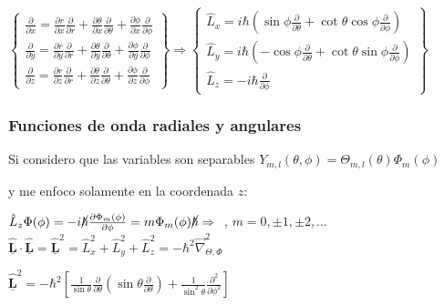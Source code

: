 \documentclass[oneside]{book}
\numberwithin{equation}{section}
\numberwithin{figure}{section}
\numberwithin{table}{section}
\newcommand{\vect}[1]{\underline{\textbf{#1}}}
\begin{document}
					\begin{center}
						$\begin{Bmatrix}{\frac{\partial}{\partial x}=\frac{\partial r}{\partial x}\frac{\partial}{\partial r}+\frac{\partial \theta}{\partial x}\frac{\partial}{\partial \theta}+\frac{\partial \phi}{\partial x}\frac{\partial}{\partial \phi}} \\ \frac{\partial}{\partial y}=\frac{\partial r}{\partial y}\frac{\partial}{\partial r}+\frac{\partial \theta}{\partial y}\frac{\partial}{\partial \theta}+\frac{\partial \phi}{\partial y}\frac{\partial}{\partial \phi} \\ \frac{\partial}{\partial z}=\frac{\partial r}{\partial z}\frac{\partial}{\partial r}+\frac{\partial \theta}{\partial z}\frac{\partial}{\partial \theta}+\frac{\partial \phi}{\partial z}\frac{\partial}{\partial \phi} \end{Bmatrix}  \Rightarrow \begin{Bmatrix}{\hat{L}_x=i\hbar \left(\sin \phi \frac{\partial}{\partial \theta}+\cot \theta \cos \phi \frac{\partial}{\partial \phi}\right)} \\ \hat{L}_y=i\hbar \left(-\cos \phi \frac{\partial}{\partial \theta}+\cot \theta \sin \phi \frac{\partial}{\partial \phi}\right) \\ \hat{L}_z=-i\hbar \frac{\partial}{\partial \phi} \end{Bmatrix}$
					\end{center}					
					
				\subsubsection{Funciones de onda radiales y angulares}		
					
					Si considero que las variables son separables $Y_{m,l}(\theta,\phi)=\Theta_{m,l}(\theta)\Phi_m(\phi)$					
					
					 y me enfoco solamente en la coordenada $z$:\\
					
					\begin{center}
						$\hat{L}_z \Phi(\phi)=-i \cancel{\hbar} \frac{\partial \Phi_m(\phi)}{\partial \phi}=m \Phi_m(\phi)\cancel{\hbar} \Rightarrow$  $\text{ , } m=0,\pm 1,\pm 2,\ldots$\\
						
						$\hat{\vect{L}} \cdot \hat{\vect{L}}=\hat{\vect{L}}^2=\hat{L}_x^2+\hat{L}_y^2+\hat{L}_z^2=-\hbar^2 \vec{\nabla}_{\Theta,\Phi}^2$
						
						$\hat{\vect{L}}^2=-\hbar^2 \left[\frac{1}{\sin \theta}\frac{\partial}{\partial \theta}\left(\sin \theta \frac{\partial}{\partial \theta} \right)+\frac{1}{\sin^2 \theta}\frac{\partial^2}{\partial \phi^2}\right]$
					\end{center}
					
\end{document}
